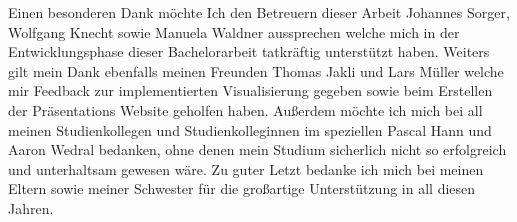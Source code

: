 Einen besonderen Dank möchte Ich den Betreuern dieser Arbeit Johannes Sorger, Wolfgang Knecht sowie Manuela Waldner aussprechen welche mich in der Entwicklungsphase dieser Bachelorarbeit tatkräftig unterstützt haben.
Weiters gilt mein Dank ebenfalls meinen Freunden Thomas Jakli und Lars Müller welche mir Feedback zur implementierten Visualisierung gegeben sowie beim Erstellen der Präsentations Website geholfen haben.
Außerdem möchte ich mich bei all meinen Studienkollegen und Studienkolleginnen im speziellen Pascal Hann und Aaron Wedral bedanken, ohne denen mein Studium sicherlich nicht so erfolgreich und unterhaltsam gewesen wäre. 
Zu guter Letzt bedanke ich mich bei meinen Eltern sowie meiner Schwester für die großartige Unterstützung in all diesen Jahren.